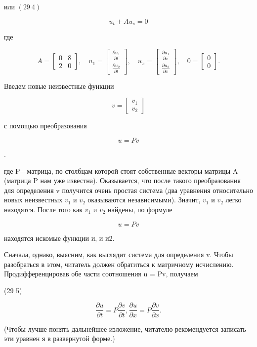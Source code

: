 \documentclass[
  ukrainian,
]{article}
\begin{document}
или \((29 \ 4)\)

\[
u_t + Au_s = 0
\]

где

\[
A = \begin{bmatrix} 0 & 8 \\ 2 & 0 \end{bmatrix}, \quad u_1 = \begin{bmatrix} \frac{\partial u_1}{\partial t} \\ \frac{\partial u_2}{\partial t} \end{bmatrix}, \quad u_x = \begin{bmatrix} \frac{\partial u_1}{\partial x} \\ \frac{\partial u_2}{\partial x} \end{bmatrix}, \quad 0 = \begin{bmatrix} 0 \\ 0 \end{bmatrix}.
\]

Введем новые неизвестные функции

\[
v = \begin{bmatrix} v_1 \\ v_2 \end{bmatrix}
\]

с помощью преобразования

\[
u = Pv
\]

.

где P---матрица, по столбцам которой стоят собственные векторы матрицы A
(матрица P нам уже известна). Оказывается, что после такого
преобразования для определения v получится очень простая система (два
уравнения относительно новых неизвестных \(v_1\) и \(v_2\) оказываются
независимыми). Значит, \(v_1\) и \(v_2\) легко находятся. После того как
\(v_1\) и \(v_2\) найдены, по формуле

\[
u = Pv
\]

находятся искомые функции и, и и2.

Сначала, однако, выясним, как выглядит система для определения v. Чтобы
разобраться в этом, читатель должен обратиться к матричному исчислению.
Продифференцировав обе части соотношения u = Pv, получаем

(29 5)

\[
\frac{\partial u}{\partial t} = P \frac{\partial v}{\partial t},
\frac{\partial u}{\partial x} = P \frac{\partial v}{\partial x}.
\]

(Чтобы лучше понять дальнейшее изложение, читателю рекомендуется
записать эти уравнен я в развернутой форме.)
\end{document}
